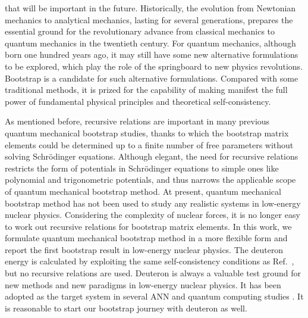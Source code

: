 \documentclass[aps,prc,reprint,superscriptaddress,nofootinbib]{revtex4-2}
\begin{document}
that will be important in the future.
Historically, the evolution
from Newtonian mechanics to analytical mechanics,
lasting for several generations,
prepares the essential ground for the revolutionary advance from classical mechanics to quantum mechanics in the twentieth century.
For quantum mechanics,
although born one hundred years ago,
it may still have some new alternative formulations to be explored,
which play the role of the springboard to new physics revolutions.
Bootstrap is a candidate for such alternative formulations. %
Compared with some traditional methods, it is prized for the capability of making manifest the full power of fundamental physical principles and theoretical self-consistency.

As mentioned before, recursive relations are important in many previous quantum mechanical bootstrap studies,
thanks to which the bootstrap matrix elements 
could be determined up to a finite number of free parameters without solving Schr\"odinger equations.
Although elegant, the need for recursive relations restricts the form of potentials in Schr\"odinger equations to simple ones like polynomial and trigonometric potentials,
and thus narrows the applicable scope of quantum mechanical bootstrap method.
At present, quantum mechanical bootstrap method has not been used to study any realistic systems in low-energy nuclear physics.
Considering the complexity of nuclear forces, it is no longer easy to work out recursive relations for bootstrap matrix elements.
In this work, we formulate quantum mechanical bootstrap method in a more flexible form and report the first bootstrap result in low-energy nuclear physics.
The deuteron energy is calculated by exploiting the same self-consistency conditions as Ref.~\cite{Han:2020bkb}, but no recursive relations are used.
Deuteron is always a valuable test ground for new methods and new paradigms in low-energy nuclear physics. 
It has been adopted as the target system in several ANN and quantum computing studies \cite{Keeble:2019bkv,Dumitrescu:2018njn,Siwach:2021tym,Du:2021ctr,Adams:2020aax,Gnech:2021wfn}.
It is reasonable to start our bootstrap journey with deuteron as well.
\end{document}
